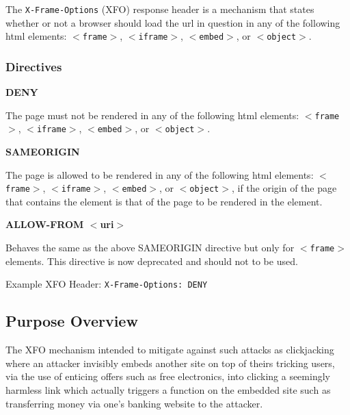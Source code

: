 \documentclass{mscreport}
\begin{document}
The \texttt{X-Frame-Options} (XFO) response header is a mechanism that states whether or not a browser should load the url in question in any of the following html elements: \texttt{$<$frame$>$}, \texttt{$<$iframe$>$}, \texttt{$<$embed$>$}, or \texttt{$<$object$>$}.

\subsubsection{Directives}

\textbf{DENY}

\vspace{0.3cm} \noindent
The page must not be rendered in any of the following html elements: \texttt{$<$frame$>$}, \texttt{$<$iframe$>$}, \texttt{$<$embed$>$}, or \texttt{$<$object$>$}.

\vspace{0.7cm} \noindent
\textbf{SAMEORIGIN}

\vspace{0.3cm} \noindent
The page is allowed to be rendered in any of the following html elements: \texttt{$<$frame$>$}, \texttt{$<$iframe$>$}, \texttt{$<$embed$>$}, or \texttt{$<$object$>$}, if the origin of the page that contains the element is that of the page to be rendered in the element.

\vspace{0.7cm} \noindent
\textbf{ALLOW-FROM $<$uri$>$}

\vspace{0.3cm} \noindent
Behaves the same as the above SAMEORIGIN directive but only for \texttt{$<$frame$>$} elements. This directive is now deprecated and should not to be used.

\vspace{0.3cm} \noindent
Example XFO Header: \texttt{X-Frame-Options: DENY}

\subsection{Purpose Overview}

\noindent
The XFO mechanism intended to mitigate against such attacks as clickjacking where an attacker invisibly embeds another site on top of theirs tricking users, via the use of enticing offers such as free electronics, into clicking a seemingly harmless link which actually triggers a function on the embedded site such as transferring money via one's banking website to the attacker.

\clearpage
\newpage
\end{document}
